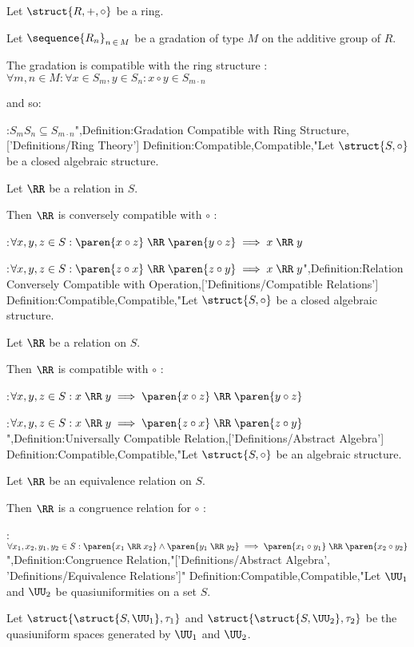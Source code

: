Let $\struct {R, +, \circ}$ be a ring.

Let $\sequence {R_n}_{n \mathop \in M}$ be a gradation of type $M$ on the additive group of $R$.


The gradation is compatible with the ring structure 
:$\forall m, n \in M : \forall x \in S_m, y \in S_n: x \circ y \in S_{m \cdot n}$

and so:

:$S_m S_n \subseteq S_ {m \cdot n}$",Definition:Gradation Compatible with Ring Structure,['Definitions/Ring Theory']
Definition:Compatible,Compatible,"Let $\struct {S, \circ}$ be a closed algebraic structure.

Let $\RR$ be a relation in $S$.


Then $\RR$ is conversely compatible with $\circ$ :

:$\forall x, y, z \in S: \paren {x \circ z} \mathrel \RR \paren {y \circ z} \implies x \mathrel \RR y$

:$\forall x, y, z \in S: \paren {z \circ x} \mathrel \RR \paren {z \circ y} \implies x \mathrel \RR y$",Definition:Relation Conversely Compatible with Operation,['Definitions/Compatible Relations']
Definition:Compatible,Compatible,"Let $\struct {S, \circ}$ be a closed algebraic structure.

Let $\RR$ be a relation on $S$.


Then $\RR$ is compatible with $\circ$ :

:$\forall x, y, z \in S: x \mathrel \RR y \implies \paren {x \circ z} \mathrel \RR \paren {y \circ z}$

:$\forall x, y, z \in S: x \mathrel \RR y \implies \paren {z \circ x} \mathrel \RR \paren {z \circ y}$
",Definition:Universally Compatible Relation,['Definitions/Abstract Algebra']
Definition:Compatible,Compatible,"Let $\struct {S, \circ}$ be an algebraic structure.

Let $\RR$ be an equivalence relation on $S$.


Then $\RR$ is a congruence relation for $\circ$ :

:$\forall x_1, x_2, y_1, y_2 \in S: \paren {x_1 \mathrel \RR x_2} \land \paren {y_1 \mathrel \RR y_2} \implies \paren {x_1 \circ y_1} \mathrel \RR \paren {x_2 \circ y_2}$",Definition:Congruence Relation,"['Definitions/Abstract Algebra', 'Definitions/Equivalence Relations']"
Definition:Compatible,Compatible,"Let $\UU_1$ and $\UU_2$ be quasiuniformities on a set $S$.

Let $\struct {\struct {S, \UU_1}, \tau_1}$ and $\struct {\struct {S, \UU_2}, \tau_2}$ be the quasiuniform spaces generated by $\UU_1$ and $\UU_2$.


